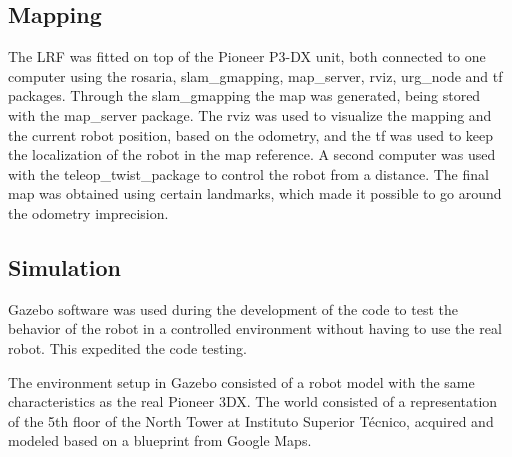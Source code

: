 \subsection{Mapping}
\label{subsec:mapping}
The LRF was fitted on top of the Pioneer P3-DX unit, both connected to one computer using the rosaria, slam\_gmapping, map\_server, rviz, urg\_node and tf packages. Through the slam\_gmapping the map was generated, being stored with the map\_server package. The rviz was used to visualize the mapping and the current robot position, based on the odometry, and the tf was used to keep the localization of the robot in the map reference. A second computer was used with the teleop\_twist\_package to control the robot from a distance. The final map was obtained using certain landmarks, which made it possible to go around the odometry imprecision.

\subsection{Simulation}
\label{subsec:simulation}
Gazebo software was used during the development of the code to test the behavior of the robot in a controlled environment without having to use the real robot. This expedited the code testing.

The environment setup in Gazebo consisted of a robot model with the same characteristics as the real Pioneer 3DX. The world consisted of a representation of the 5th floor of the North Tower at Instituto Superior Técnico, acquired and modeled based on a blueprint from Google Maps.